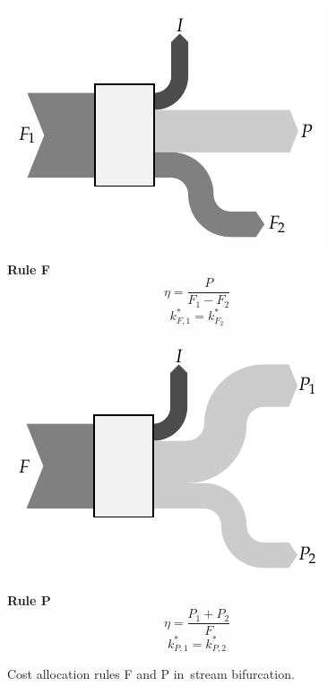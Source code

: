 \documentclass[energies,article,accept,moreauthors,pdftex]{Definitions/mdpi}
\begin{document}
\begin{figure}[H]
	\centering
	
	\begin{center}
		\begin{minipage}[c]{0.50\linewidth}
			\includegraphics{reglaF.pdf}
		\end{minipage}
		\begin{minipage}[c]{0.45\linewidth}
			\centering
			\textbf{Rule F}
			\begin{equation*}
			\eta=\frac{P}{F_1-F_2}
			\end{equation*}
			\begin{equation*}
			k_{F,1}^*=k_{F_2}^*
			\end{equation*}
		\end{minipage}
	\end{center}
	\begin{center}
		\begin{minipage}[c]{0.50\linewidth}
			\includegraphics{reglaP.pdf}
		\end{minipage}
		\begin{minipage}[c]{0.45\linewidth}
			\centering
			\textbf{Rule P}
			\begin{equation*}
			\eta=\frac{P_1+P_2}{F}
			\end{equation*}
			\begin{equation*}
			k_{P,1}^*=k_{P,2}^*
			\end{equation*}
		\end{minipage}
	\end{center}
	\caption{Cost allocation rules F and P in~stream bifurcation.}
	\label{fig:RulesFP}
\end{figure}
\end{document}
